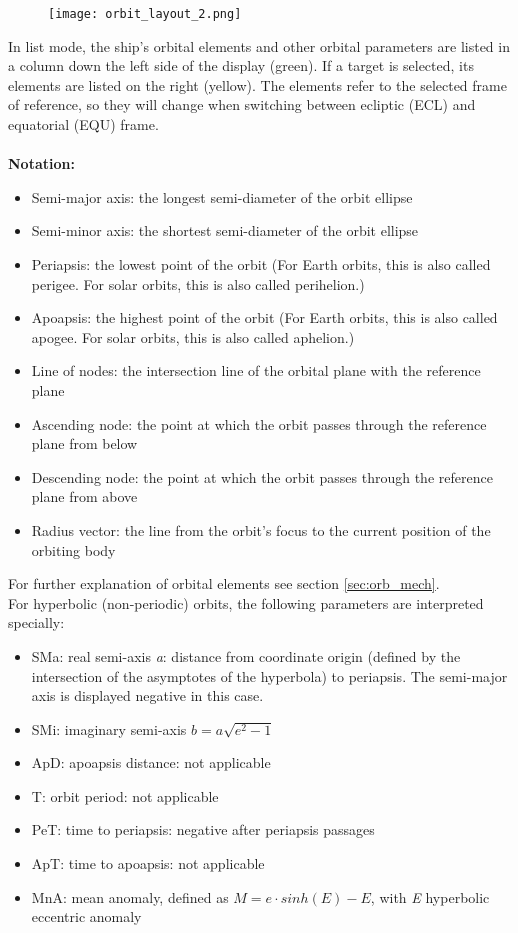 \documentclass[Orbiter User Manual.tex]{subfiles}
\begin{document}
\begin{figure}[H]
  \centering
  \texttt{[image: orbit\_layout\_2.png]}
\end{figure}

\noindent
In list mode, the ship's orbital elements and other orbital parameters are listed in a column down the left side of the display (green). If a target is selected, its elements are listed on the right (yellow). The elements refer to the selected frame of reference, so they will change when switching between ecliptic (ECL) and equatorial (EQU) frame.\\
\\
\textbf{Notation:}

\begin{itemize}
\item Semi-major axis: the longest semi-diameter of the orbit ellipse
\item Semi-minor axis: the shortest semi-diameter of the orbit ellipse
\item Periapsis: the lowest point of the orbit (For Earth orbits, this is also called perigee. For solar orbits, this is also called perihelion.)
\item Apoapsis: the highest point of the orbit (For Earth orbits, this is also called apogee. For solar orbits, this is also called aphelion.)
\item Line of nodes: the intersection line of the orbital plane with the reference plane
\item Ascending node: the point at which the orbit passes through the reference plane from below
\item Descending node: the point at which the orbit passes through the reference plane from above
\item Radius vector: the line from the orbit's focus to the current position of the orbiting body
\end{itemize}

\noindent
For further explanation of orbital elements see section \ref{sec:orb_mech}.\\
For hyperbolic (non-periodic) orbits, the following parameters are interpreted specially:

\begin{itemize}
\item SMa: real semi-axis \textit{a}: distance from coordinate origin (defined by the intersection of the asymptotes of the hyperbola) to periapsis. The semi-major axis is displayed negative in this case.
\item SMi: imaginary semi-axis $b = a \sqrt{e^{2} - 1}$
\item ApD: apoapsis distance: not applicable
\item T: orbit period: not applicable
\item PeT: time to periapsis: negative after periapsis passages
\item ApT: time to apoapsis: not applicable
\item MnA: mean anomaly, defined as $M = e \cdot sinh(E) - E$, with \textit{E} hyperbolic eccentric anomaly
\end{itemize}
\end{document}
